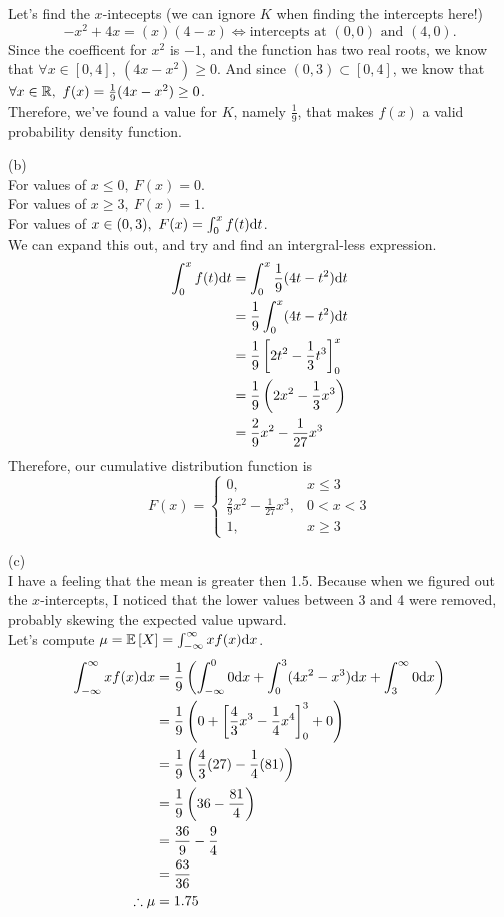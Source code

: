 \documentclass[a4paper,12pt]{report}
\begin{document}
Let's find the $x$-intecepts (we can ignore $K$ when finding the intercepts here!)
$$
  -x^2 + 4x = (x)(4-x) \iff \text{intercepts at } (0,0) \text{ and } (4,0).
$$
Since the coefficent for $x^2$ is $-1$, and the function has two real roots, we know that $\forall x\in[0,4],\ (4x - x^2)\geq0$. And since $(0,3)\subset[0,4]$, we know that $\forall x\in\bbr,\ f(x)=\frac{1}{9}(4x-x^2)\geq0$. \\
Therefore, we've found a value for $K$, namely $\frac{1}{9}$, that makes $f(x)$ a valid probability density function.

\newpage
\sol (b) \\
For values of $x\leq 0,\ F(x) = 0$. \\
For values of $x\geq 3,\ F(x) = 1$. \\
For values of $x\in(0,3),\ F(x) = \int_{0}^{x} f(t)\mathrm{d} t$. \\
We can expand this out, and try and find an intergral-less expression.
\begin{align*}
  \int_{0}^{x} f(t)\mathrm{d} t &= \int_{0}^{x} \frac{1}{9}(4t-t^2) \mathrm{d} t \\
    &= \frac{1}{9} \int_{0}^{x} (4t-t^2) \mathrm{d} t \\
    &= \frac{1}{9} \left[ 2t^2-\frac{1}{3}t^3 \right]_{0}^{x} \\
    &= \frac{1}{9} \left( 2x^2-\frac{1}{3}x^3 \right) \\
    &= \frac{2}{9}x^2-\frac{1}{27}x^3 \\
\end{align*}
Therefore, our cumulative distribution function is
$$
  F(x) = \left\lbrace \begin{array}{ll} 0, & x\leq 3 \\ \frac{2}{9}x^2 - \frac{1}{27}x^3, & 0 < x < 3 \\ 1, & x \geq 3 \end{array} \right.
$$

\sol (c) \\
I have a feeling that the mean is greater then 1.5. Because when we figured out the $x$-intercepts, I noticed that the lower values between 3 and 4 were removed, probably skewing the expected value upward. \\
Let's compute $\mu = \mathbb{E}\left[ X \right] = \int_{-\infty}^{\infty} xf(x)\mathrm{d} x$. 
\begin{align*}
  \int_{-\infty}^{\infty} xf(x)\mathrm{d} x &= \frac{1}{9}\left( \int_{-\infty}^{0} 0\mathrm{d} x + \int_{0}^{3} (4x^2-x^3)\mathrm{d} x + \int_{3}^{\infty} 0\mathrm{d} x \right) \\
    &= \frac{1}{9}\left( 0 + \left[ \frac{4}{3}x^3-\frac{1}{4}x^4 \right]_{0}^{3} + 0 \right) \\
    &= \frac{1}{9}\left( \frac{4}{3}(27)-\frac{1}{4}(81) \right) \\
    &= \frac{1}{9}\left( 36-\frac{81}{4} \right) \\
    &= \frac{36}{9} - \frac{9}{4} \\
    &= \frac{63}{36} \\
  \therefore \mu &= 1.75 
\end{align*}
\end{document}
